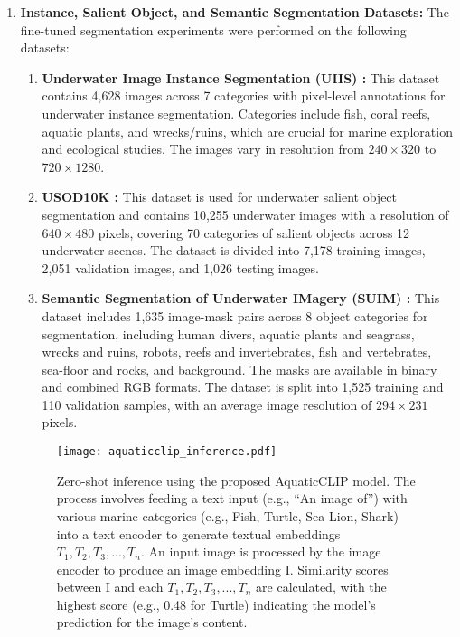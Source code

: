 \begin{enumerate}
    \item \textbf{Instance, Salient Object, and Semantic Segmentation Datasets:} The fine-tuned segmentation experiments were performed on the following datasets:

\begin{enumerate}
    \item \textbf{Underwater Image Instance Segmentation (UIIS) \cite{Lian_2023_ICCV}:} This dataset contains 4,628 images across 7 categories with pixel-level annotations for underwater instance segmentation. 
Categories include fish, coral reefs, aquatic plants, and wrecks/ruins, which are crucial for marine exploration and ecological studies. 
The images vary in resolution from $240 \times 320$ to $720 \times 1280$.

\item \textbf{USOD10K \cite{usod10k}:} This dataset is used for underwater salient object segmentation and contains 10,255 underwater images with a resolution of $640 \times 480$ pixels, covering 70 categories of salient objects across 12 underwater scenes. 
The dataset is divided into 7,178 training images, 2,051 validation images, and 1,026 testing images.

\item \textbf{Semantic Segmentation of Underwater IMagery (SUIM) \cite{islam2020suim}:} 
This dataset includes 1,635 image-mask pairs across 8 object categories for segmentation, including human divers, aquatic plants and seagrass, wrecks and ruins, robots, reefs and invertebrates, fish and vertebrates, sea-floor and rocks, and background. 
The masks are available in binary and combined RGB formats. 
The dataset is split into 1,525 training and 110 validation samples, with an average image resolution of $294 \times 231$ pixels.
\end{enumerate}

 \begin{figure*}[t!]
\centering
\texttt{[image: aquaticclip\_inference.pdf]}
\caption{Zero-shot inference using the proposed AquaticCLIP model. The process involves feeding a text input (e.g., ``An image of'') with various marine categories (e.g., Fish, Turtle, Sea Lion, Shark) into a text encoder to generate textual embeddings $T_{1}, T_{2}, T_{3},...,T_{n}$.
An input image is processed by the image encoder to produce an image embedding I.
Similarity scores between I and each $T_{1}, T_{2}, T_{3},...,T_{n}$ are calculated, with the highest score (e.g., 0.48 for Turtle) indicating the model’s prediction for the image's content.}
\label{fig:inference}
\end{figure*}


\end{enumerate}
